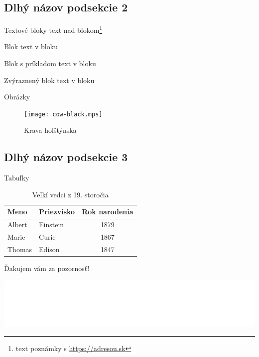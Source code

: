 \documentclass[
]{beamer}
\begin{document}
\subsection[Názov podsekcie 2]{Dlhý názov podsekcie 2}

\begin{frame}{Textové bloky}
text nad blokom\footnote{text poznámky s \url{https://adresou.sk}}
\begin{block}{Blok}
  text v bloku
\end{block}
\begin{exampleblock}{Blok s príkladom}
  text v bloku
\end{exampleblock}
\begin{alertblock}{Zvýraznený blok}
  text v bloku
\end{alertblock}
\end{frame}

\begin{frame}{Obrázky}
\begin{figure}
  \texttt{[image: cow-black.mps]}
  \caption{Krava holštýnska}
\end{figure}
\end{frame}

\subsection[Názov podsekcie 3]{Dlhý názov podsekcie 3}

\begin{frame}{Tabuľky}
\begin{table}
  \begin{tabular}{llc}
    Meno & Priezvisko & Rok narodenia \\ \midrule
    Albert & Einstein & 1879 \\
    Marie & Curie & 1867 \\
    Thomas & Edison & 1847 \\
  \end{tabular}
  \caption{Veľkí vedci z 19. storočia}
\end{table}
\end{frame}

\begin{frame}[plain]
\vfill
\centerline{Ďakujem vám za pozornosť!}
\vfill\vfill
\end{frame}

\begingroup
{}
\begin{frame}[plain]
\vfill
\centering
\includegraphics[width=\textwidth]{institution}
\vfill
\end{frame}
\endgroup
\end{document}
